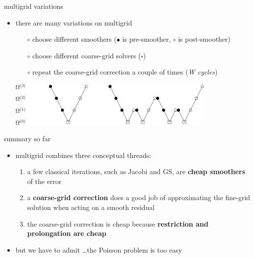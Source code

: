 \documentclass[10pt,
               svgnames,
               hyperref={colorlinks,citecolor=DeepPink4,linkcolor=FireBrick,urlcolor=Maroon},
               usepdftitle=false]{beamer}
\begin{document}
\begin{frame}{multigrid variations}
\begin{itemize}
\item there are many variations on multigrid
	\begin{itemize}
	\item[$\circ$] choose different smoothers ({\large $\bullet$} is pre-smoother, {\large $\circ$} is post-smoother)
	\item[$\circ$] choose different coarse-grid solvers ($\square$)
	\item[$\circ$] repeat the coarse-grid correction a couple of times (\emph{W cycles})
	\end{itemize}

\bigskip\bigskip
\hfill \includegraphics[width=0.8\textwidth]{images/multigrid-cycles.png}
\end{itemize}
\end{frame}


\begin{frame}{summary so far}
\begin{itemize}
\item multigrid combines three conceptual threads:
\begin{enumerate}
\item a few classical iterations, such as Jacobi and GS, are \textbf{cheap smoothers} of the error
\item a \textbf{coarse-grid correction} does a good job of approximating the fine-grid solution when acting on a smooth residual
\item the coarse-grid correction is cheap because \textbf{restriction and prolongation are cheap}
\end{enumerate}

\bigskip
\item<2> but we have to admit \dots the Poisson problem is too easy
\end{itemize}
\end{frame}
\end{document}
